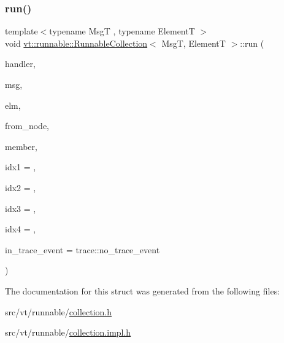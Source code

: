 \subsubsection{\texorpdfstring{run()}{run()}}
{\footnotesize\ttfamily template$<$typename MsgT , typename ElementT $>$ \\
void \hyperlink{structvt_1_1runnable_1_1_runnable_collection}{vt\+::runnable\+::\+Runnable\+Collection}$<$ MsgT, ElementT $>$\+::run (\begin{DoxyParamCaption}\item[{\hyperlink{namespacevt_af64846b57dfcaf104da3ef6967917573}{Handler\+Type}}]{handler,  }\item[{MsgT $\ast$}]{msg,  }\item[{ElementT $\ast$}]{elm,  }\item[{\hyperlink{namespacevt_a866da9d0efc19c0a1ce79e9e492f47e2}{Node\+Type}}]{from\+\_\+node,  }\item[{bool}]{member,  }\item[{uint64\+\_\+t}]{idx1 = {},  }\item[{uint64\+\_\+t}]{idx2 = {},  }\item[{uint64\+\_\+t}]{idx3 = {},  }\item[{uint64\+\_\+t}]{idx4 = {},  }\item[{\hyperlink{namespacevt_1_1trace_a64a7185f3e102df8d8258f263ccd1582}{trace\+::\+Trace\+Event\+I\+D\+Type}}]{in\+\_\+trace\+\_\+event = {\ttfamily trace\+:\+:no\+\_\+trace\+\_\+event} }\end{DoxyParamCaption})\hspace{0.3cm}{\ttfamily [static]}}



The documentation for this struct was generated from the following files\+:\begin{DoxyCompactItemize}
\item 
src/vt/runnable/\hyperlink{collection_8h}{collection.\+h}\item 
src/vt/runnable/\hyperlink{collection_8impl_8h}{collection.\+impl.\+h}\end{DoxyCompactItemize}
